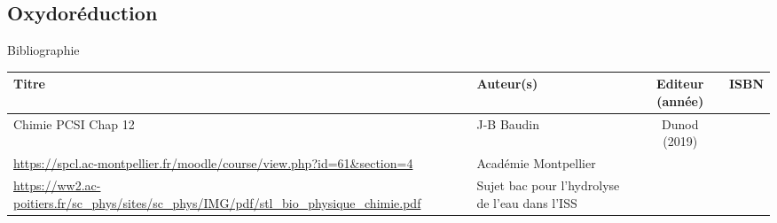 \begin{headerBlock}
\chapter{Oxydoréduction}
\label{LC_Oxydoreduction_SPCL}
 \end{headerBlock}



\begin{reportBlock}{Bibliographie}

\begin{center}
\begin{tabularx}{\textwidth}{| X | X | c | c |}\hline
Titre & Auteur(s) & Editeur (année) & ISBN \\ \hline
 Chimie PCSI Chap 12 & J-B Baudin & Dunod (2019) &  \\ 
 \hline
 \url{https://spcl.ac-montpellier.fr/moodle/course/view.php?id=61&section=4} & Académie Montpellier & & \\
 \hline
 \url{https://ww2.ac-poitiers.fr/sc_phys/sites/sc_phys/IMG/pdf/stl_bio_physique_chimie.pdf} & Sujet bac pour l'hydrolyse de l'eau dans l'ISS & & \\
\end{tabularx}
\end{center}

\end{reportBlock}

